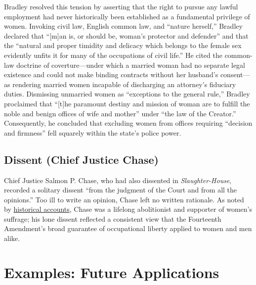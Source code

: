 \documentclass[12pt]{article}
\begin{document}
Bradley resolved this tension by asserting that the right to pursue any lawful employment had never historically been established as a fundamental privilege of women. Invoking civil law, English common law, and ``nature herself,'' Bradley declared that ``[m]an is, or should be, woman's protector and defender'' and that the ``natural and proper timidity and delicacy which belongs to the female sex evidently unfits it for many of the occupations of civil life.'' He cited the common-law doctrine of coverture---under which a married woman had no separate legal existence and could not make binding contracts without her husband's consent---as rendering married women incapable of discharging an attorney's fiduciary duties. Dismissing unmarried women as ``exceptions to the general rule,'' Bradley proclaimed that ``[t]he paramount destiny and mission of woman are to fulfill the noble and benign offices of wife and mother'' under ``the law of the Creator.'' Consequently, he concluded that excluding women from offices requiring ``decision and firmness'' fell squarely within the state's police power.

\subsection{Dissent (Chief Justice Chase)}

Chief Justice Salmon P. Chase, who had also dissented in \textit{Slaughter-House}, recorded a solitary dissent ``from the judgment of the Court and from all the opinions.'' Too ill to write an opinion, Chase left no written rationale. As noted by \href{https://en.wikipedia.org/wiki/Bradwell_v._Illinois}{historical accounts}, Chase was a lifelong abolitionist and supporter of women's suffrage; his lone dissent reflected a consistent view that the Fourteenth Amendment's broad guarantee of occupational liberty applied to women and men alike.

\section{Examples: Future Applications}
\end{document}
